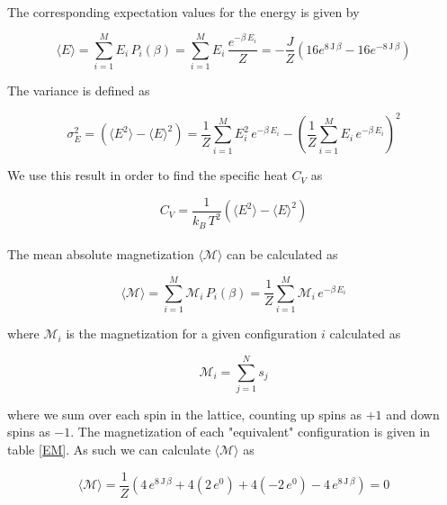 \documentclass[a4paper, fontsize=11pt]{article}
\begin{document}
\paragraph{}
The corresponding expectation values for the energy is given by

\begin{equation}
\langle E \rangle = \sum^M_{i=1} E_{i} \, P_{i}(\beta) = \sum^M_{i=1} E_{i} \, \dfrac{e^{-\beta \, E_{i}}}{Z} = -\dfrac{J}{Z} \left(16 e^{8 \, \text{J} \, \beta} - 16 e^{-8 \, \text{J} \, \beta} \right)
\end{equation}

The variance is defined as

\begin{equation}
\sigma^2_{E} = \left( \langle E^2 \rangle - \langle E \rangle^2 \right) = \dfrac{1}{Z} \sum^M_{i=1} E_{i}^2 \, e^{-\beta \, E_{i}} - \left( \dfrac{1}{Z} \sum^M_{i=1} E_{i} \, e^{-\beta \, E_{i}} \right)^2
\end{equation}

We use this result in order to find the specific heat  $C_{V}$ as

\begin{equation}
C_{V} = \dfrac{1}{k_{B} \, T^2} \left( \langle E^2 \rangle - \langle E \rangle^2 \right)
\end{equation}

\paragraph{}
The mean absolute magnetization $\langle \mathcal{M} \rangle$ can be calculated as

\begin{equation}
\langle \mathcal{M} \rangle = \sum^M_{i=1} \mathcal{M}_{i} \, P_{i}(\beta) = \dfrac{1}{Z} \sum^M_{i=1} \mathcal{M}_{i} \, e^{-\beta \, E_{i}}
\end{equation}

where $\mathcal{M}_{i}$ is the magnetization for a given configuration $i$ calculated as

\begin{equation}
\mathcal{M}_{i} = \sum^N_{j=1} s_{j}
\end{equation}

where we sum over each spin in the lattice, counting up spins as $+1$ and down spins as $-1$. The magnetization of each "equivalent" configuration is given in table \ref{EM}. As such we can calculate $\langle \mathcal{M} \rangle$ as

\begin{equation}
\langle \mathcal{M} \rangle = \dfrac{1}{Z} \left( 4 \, e^{8 \, \text{J} \, \beta} + 4 (2 \, e^0) + 4 ( -2 \, e^0) -4 \, e^{8 \, \text{J} \, \beta} \right) = 0
\end{equation}
\end{document}
